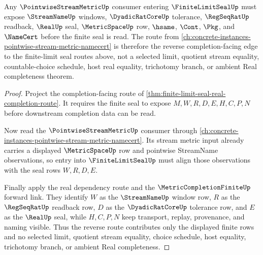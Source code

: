 \begin{theorem}
\label{thm:finite-limit-seal-pointwise-stream-metric-reverse-route}
Any $\PointwiseStreamMetricUp$ consumer entering $\FiniteLimitSealUp$ must expose $\StreamNameUp$ windows, $\DyadicRatCoreUp$ tolerance, $\RegSeqRatUp$ readback, $\RealUp$ seal, $\MetricSpaceUp$ row, $\hsame$, $\Cont$, $\Pkg$, and $\NameCert$ before the finite seal is read. The route from \autoref{ch:concrete-instances-pointwise-stream-metric-namecert} is therefore the reverse completion-facing edge to the finite-limit seal routes above, not a selected limit, quotient stream equality, countable-choice schedule, host real equality, trichotomy branch, or ambient Real completeness theorem.
\end{theorem}
\begin{proof}
Project the completion-facing route of \autoref{thm:finite-limit-seal-real-completion-route}. It requires the finite seal to expose $M,W,R,D,E,H,C,P,N$ before downstream completion data can be read.

Now read the $\PointwiseStreamMetricUp$ consumer through \autoref{ch:concrete-instances-pointwise-stream-metric-namecert}. Its stream metric input already carries a displayed $\MetricSpaceUp$ row and pointwise StreamName observations, so entry into $\FiniteLimitSealUp$ must align those observations with the seal rows $W,R,D,E$.

Finally apply the real dependency route and the $\MetricCompletionFiniteUp$ forward link. They identify $W$ as the $\StreamNameUp$ window row, $R$ as the $\RegSeqRatUp$ readback row, $D$ as the $\DyadicRatCoreUp$ tolerance row, and $E$ as the $\RealUp$ seal, while $H,C,P,N$ keep transport, replay, provenance, and naming visible. Thus the reverse route contributes only the displayed finite rows and no selected limit, quotient stream equality, choice schedule, host equality, trichotomy branch, or ambient Real completeness.
\end{proof}
